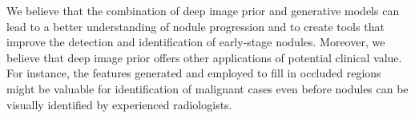 \documentclass[runningheads]{llncs}
\begin{document}
We believe that the combination of deep image prior and generative models can lead to a better understanding of nodule progression and to create tools that improve the detection and identification of early-stage nodules. Moreover, we believe that deep image prior offers other applications of potential clinical value. For instance, the features generated and employed to fill in occluded regions might be valuable for identification of malignant cases even before nodules can be visually identified by experienced radiologists.
%
%
%
% 
% 
%
\printbibliography




\end{document}
